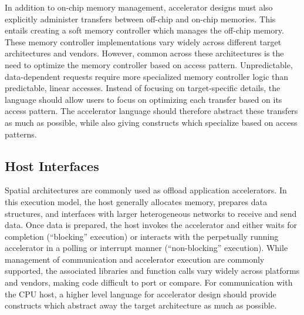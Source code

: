 In addition to on-chip memory management, accelerator designs must also explicitly administer transfers between off-chip and on-chip memories.
This entails creating a soft memory controller which manages the off-chip memory.
These memory controller implementations vary widely across different target architectures and vendors.
However, common across these architectures is the need to optimize the memory controller based on access pattern.
Unpredictable, data-dependent requests require more specialized memory controller logic than predictable, linear accesses.
Instead of focusing on target-specific details, the language should allow users to focus on optimizing each
transfer based on its access pattern.
The accelerator language should therefore abstract these transfers as much as possible, while also giving constructs which specialize based on access patterns.

\subsection{Host Interfaces}
Spatial architectures are commonly used as offload application accelerators.
In this execution model, the host generally allocates memory, prepares data structures, and interfaces with larger heterogeneous networks to receive and send data.
Once data is prepared, the host invokes the accelerator and either waits for completion (``blocking'' execution)
or interacts with the perpetually running accelerator in a polling or interrupt manner (``non-blocking'' execution).
While management of communication and accelerator execution are commonly supported, the associated libraries and function calls vary widely across platforms and vendors, making code difficult to port or compare.
For communication with the CPU host, a higher level language for accelerator design should provide constructs which abstract away the target architecture as much as possible.


